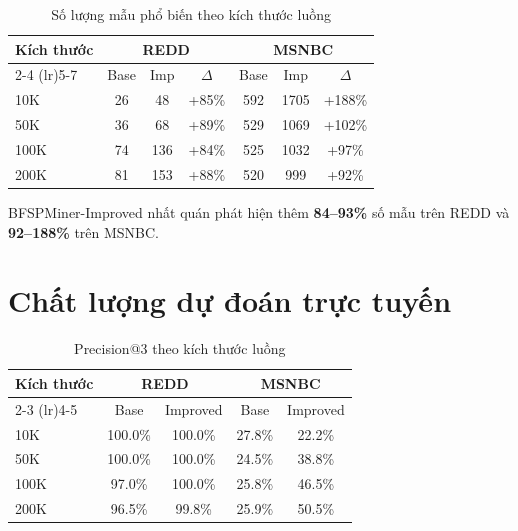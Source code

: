 \documentclass[a4paper,12pt]{report}
\begin{document}
\begin{table}[H]
    \centering
    \caption{Số lượng mẫu phổ biến theo kích thước luồng}
    \label{tab:patterns}
    \begin{tabular}{lcccccc}
        \toprule
        \multirow{2}{*}{\textbf{Kích thước}} & \multicolumn{3}{c}{\textbf{REDD}} & \multicolumn{3}{c}{\textbf{MSNBC}} \\
        \cmidrule(lr){2-4} \cmidrule(lr){5-7}
         & Base & Imp & $\Delta$ & Base & Imp & $\Delta$ \\
        \midrule
        10K  & 26  & 48  & +85\%  & 592  & 1705 & +188\% \\
        50K  & 36  & 68  & +89\%  & 529  & 1069 & +102\% \\
        100K & 74  & 136 & +84\%  & 525  & 1032 & +97\%  \\
        200K & 81  & 153 & +88\%  & 520  & 999  & +92\%  \\
        \bottomrule
    \end{tabular}
\end{table}

BFSPMiner-Improved nhất quán phát hiện thêm \textbf{84--93\%} số mẫu trên REDD và \textbf{92--188\%} trên MSNBC.

\section{Chất lượng dự đoán trực tuyến}

\begin{table}[H]
    \centering
    \caption{Precision@3 theo kích thước luồng}
    \label{tab:hitrate}
    \begin{tabular}{lcccc}
        \toprule
        \multirow{2}{*}{\textbf{Kích thước}} & \multicolumn{2}{c}{\textbf{REDD}} & \multicolumn{2}{c}{\textbf{MSNBC}} \\
        \cmidrule(lr){2-3} \cmidrule(lr){4-5}
         & Base & Improved & Base & Improved \\
        \midrule
        10K  & 100.0\% & 100.0\% & 27.8\% & 22.2\% \\
        50K  & 100.0\% & 100.0\% & 24.5\% & 38.8\% \\
        100K & 97.0\%  & 100.0\% & 25.8\% & 46.5\% \\
        200K & 96.5\%  & 99.8\%  & 25.9\% & 50.5\% \\
        \bottomrule
    \end{tabular}
\end{table}
\end{document}
